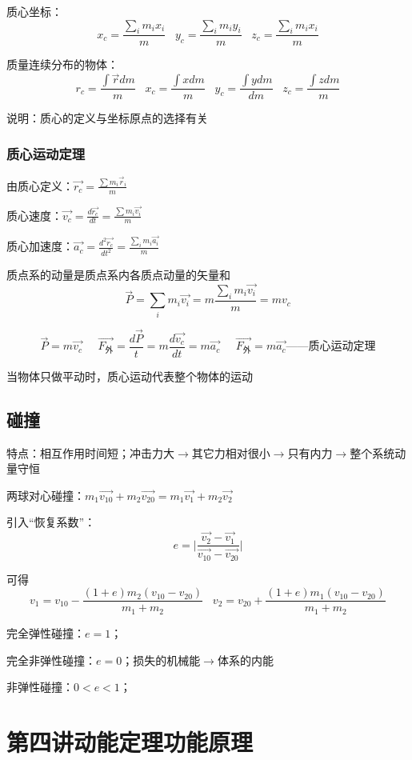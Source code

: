 \documentclass[UTF8]{article}
\begin{document}
    质心坐标：\[x_c = \frac{\sum_i m_i x_i}{m}\;\;\;y_c = \frac{\sum_im_iy_i}{m}\;\;\;z_c = \frac{\sum_im_ix_i}{m}\]

    质量连续分布的物体：\[r_c = \frac{\int\vec{r}dm}{m}\;\;\;x_c = \frac{\int xdm}{m}\;\;\;y_c = \frac{\int ydm}{dm}\;\;\;z_c = \frac{\int zdm}{m}\]

    说明：质心的定义与坐标原点的选择有关

\subsubsection{质心运动定理}

    由质心定义：$\vec{r_c} = \frac{\sum m_i\vec r_i}{m}$
    
    质心速度：$\vec{v_c} = \frac{d\vec{r_c}}{dt} = \frac{\sum m_i\vec{v_i}}{m}$

    质心加速度：$\vec{a_c} = \frac{d^2\vec{r_c}}{dt^2} = \frac{\sum_i m_i\vec{a_i}}{m}$

    质点系的动量是质点系内各质点动量的矢量和
    \[\vec{P} = \sum_i m_i\vec{v_i} = m\frac{\sum_i m_i\vec{v_i}}{m} = mv_c\]

    \[\vec{P} = m\vec{v_c}\;\;\;\;\;\vec{F_{\mbox{外}}} = \frac{d\vec{P}}{t} = m\frac{d\vec{v_c}}{dt} = m\vec{a_c}\;\;\;\;\;\vec{F_{\mbox{外}}} = m\vec{a_c}\mbox{——质心运动定理}\]

    当物体只做平动时，质心运动代表整个物体的运动

\subsection{碰撞}

    特点：相互作用时间短；冲击力大$\rightarrow$其它力相对很小$\rightarrow$只有内力$\rightarrow$整个系统动量守恒

    两球对心碰撞：$m_1\vec{v_{10}} + m_2\vec{v_{20}} = m_1\vec{v_1} + m_2\vec{v_2}$

    引入“恢复系数”：\[e = \lvert \frac{\vec{v_2} - \vec{v_1}}{\vec{v_{10}} - \vec{v_{20}}} \rvert\]

    可得\[v_1 = v_{10} - \frac{(1+e)m_2(v_{10} - v_{20})}{m_1 + m_2}\;\;\;v_2 = v_{20} + \frac{(1+e)m_1(v_{10} - v_{20})}{m_1 + m_2}\]

    完全弹性碰撞：$e = 1$；

    完全非弹性碰撞：$e = 0$；损失的机械能$\rightarrow$体系的内能

    非弹性碰撞：$0<e<1$；

\newpage
\section{第四讲\;\;动能定理\;\;功能原理}
\end{document}
